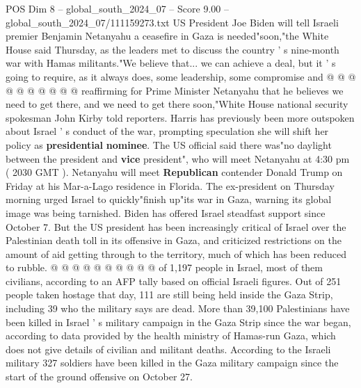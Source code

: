 \begin{textsample}{POS Dim 8 – global\_south\_2024\_07 – Score 9.00 – global\_south\_2024\_07/111159273.txt}
US President Joe Biden will tell Israeli premier Benjamin Netanyahu a ceasefire in Gaza is needed"soon,"the White House said Thursday, as the leaders met to discuss the country ' s nine-month war with Hamas militants."We believe that... we can achieve a deal, but it ' s going to require, as it always does, some leadership, some compromise and @ @ @ @ @ @ @ @ @ @ reaffirming for Prime Minister Netanyahu that he believes we need to get there, and we need to get there soon,"White House national security spokesman John Kirby told reporters.
Harris has previously been more outspoken about Israel ' s conduct of the war, prompting speculation she will shift her policy as \textbf{presidential} \textbf{nominee}.
The US official said there was"no daylight between the president and \textbf{vice} president", who will meet Netanyahu at 4:30 pm ( 2030 GMT ).
Netanyahu will meet \textbf{Republican} contender Donald Trump on Friday at his Mar-a-Lago residence in Florida.
The ex-president on Thursday morning urged Israel to quickly"finish up"its war in Gaza, warning its global image was being tarnished.
Biden has offered Israel steadfast support since October 7.
But the US president has been increasingly critical of Israel over the Palestinian death toll in its offensive in Gaza, and criticized restrictions on the amount of aid getting through to the territory, much of which has been reduced to rubble. @ @ @ @ @ @ @ @ @ @ of 1,197 people in Israel, most of them civilians, according to an AFP tally based on official Israeli figures.
Out of 251 people taken hostage that day, 111 are still being held inside the Gaza Strip, including 39 who the military says are dead.
More than 39,100 Palestinians have been killed in Israel ' s military campaign in the Gaza Strip since the war began, according to data provided by the health ministry of Hamas-run Gaza, which does not give details of civilian and militant deaths.
According to the Israeli military 327 soldiers have been killed in the Gaza military campaign since the start of the ground offensive on October 27.

\end{textsample}
